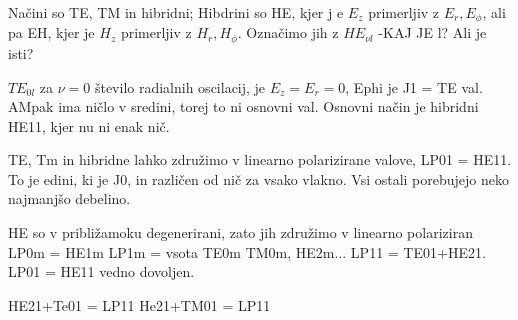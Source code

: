 Načini so TE, TM in hibridni;
Hibdrini so HE, kjer j e $E_z$ primerljiv z $E_r, E_\phi$, ali pa EH, kjer je 
$H_z$ primerljiv z $H_r, H_\phi$. Označimo jih z $HE_{\nu l}$ -KAJ JE l? Ali je isti?

$TE_{0l}$ za $\nu=0$ število radialnih oscilacij, je $E_z=E_r=0$, Ephi je J1 = TE val.
AMpak ima ničlo v sredini, torej to ni osnovni val. Osnovni način je hibridni HE11, kjer 
nu ni enak nič. 

TE, Tm in hibridne lahko združimo  v linearno polarizirane valove, LP01 = HE11.
To je edini, ki je J0, in različen od nič za vsako vlakno.  Vsi ostali porebujejo neko
najmanjšo debelino. 

HE so v približamoku degenerirani, zato jih združimo v linearno polariziran
LP0m = HE1m
LP1m = vsota TE0m TM0m, HE2m...
LP11 = TE01+HE21.
LP01 = HE11 vedno dovoljen. 

HE21+Te01 = LP11
He21+TM01 = LP11






